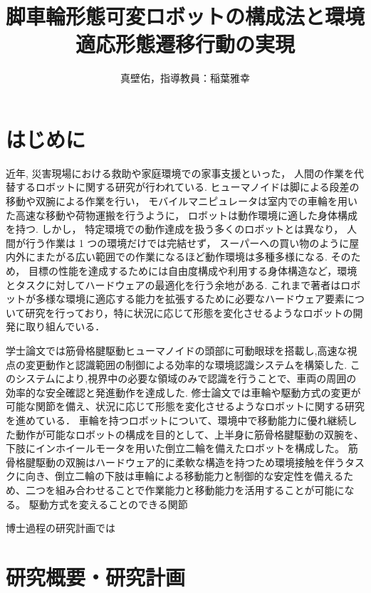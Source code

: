 \documentclass[twocolumn]{d-abst}
\title{脚車輪形態可変ロボットの構成法と環境適応形態遷移行動の実現}
\author{真壁佑，指導教員：稲葉雅幸}
\begin{document}
\pagestyle{empty}
\maketitle
\thispagestyle{empty}
\sloppy

\section{はじめに}
近年, 災害現場における救助や家庭環境での家事支援といった， 人間の作業を代替するロボットに関する研究が行われている.
ヒューマノイドは脚による段差の移動や双腕による作業を行い， モバイルマニピュレータは室内での車輪を用いた高速な移動や荷物運搬を行うように， ロボットは動作環境に適した身体構成を持つ.
しかし， 特定環境での動作達成を扱う多くのロボットとは異なり， 人間が行う作業は 1 つの環境だけでは完結せず， スーパーへの買い物のように屋内外にまたがる広い範囲での作業になるほど動作環境は多種多様になる.
そのため， 目標の性能を達成するためには自由度構成や利用する身体構造など，環境とタスクに対してハードウェアの最適化を行う余地がある.
これまで著者はロボットが多様な環境に適応する能力を拡張するために必要なハードウェア要素について研究を行っており，特に状況に応じて形態を変化させるようなロボットの開発に取り組んでいる．

学士論文では筋骨格腱駆動ヒューマノイドの頭部に可動眼球を搭載し,高速な視点の変更動作と認識範囲の制御による効率的な環境認識システムを構築した.
このシステムにより,視界中の必要な領域のみで認識を行うことで、車両の周囲の効率的な安全確認と発進動作を達成した\cite{makabe2018eye}.
修士論文では車輪や駆動方式の変更が可能な関節を備え、状況に応じて形態を変化させるようなロボットに関する研究を進めている．
車輪を持つロボットについて、環境中で移動能力に優れ継続した動作が可能なロボットの構成を目的として、上半身に筋骨格腱駆動の双腕を、下肢にインホイールモータを用いた倒立二輪を備えたロボットを構成した。
筋骨格腱駆動の双腕はハードウェア的に柔軟な構造を持つため環境接触を伴うタスクに向き、倒立二輪の下肢は車輪による移動能力と制御的な安定性を備えるため、二つを組み合わせることで作業能力と移動能力を活用することが可能になる。
駆動方式を変えることのできる関節

博士過程の研究計画では


\cite{makabe2019module}\cite{kawaharazuka2018twimp}



\section{研究概要・研究計画}
\end{document}
